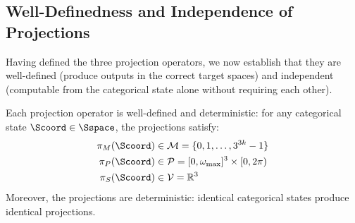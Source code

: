 \subsection{Well-Definedness and Independence of Projections}

Having defined the three projection operators, we now establish that they are well-defined (produce outputs in the correct target spaces) and independent (computable from the categorical state alone without requiring each other).

\begin{theorem}
\label{thm:projection_welldef}
Each projection operator is well-defined and deterministic: for any categorical state $\Scoord \in \Sspace$, the projections satisfy:
\begin{align}
\pi_M(\Scoord) &\in \mathcal{M} = \{0, 1, \ldots, 3^{3k} - 1\} \label{eq:welldef_M} \\
\pi_P(\Scoord) &\in \mathcal{P} = [0, \omega_{\max}]^3 \times [0, 2\pi) \label{eq:welldef_P} \\
\pi_S(\Scoord) &\in \mathcal{V} = \mathbb{R}^3 \label{eq:welldef_S}
\end{align}
Moreover, the projections are deterministic: identical categorical states produce identical projections.
\end{theorem}

